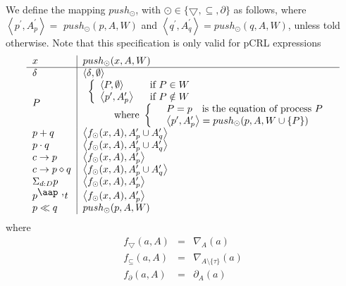 \documentclass{article}
\begin{document}
We define the mapping $push_{\odot }$, with $\odot \in \{\bigtriangledown
,\subseteq ,\partial \}$ as follows, where $\left\langle p^{\prime
},A_{p}^{\prime }\right\rangle =$ $push_{\odot }(p,A,W)$ and $\left\langle
q^{\prime },A_{q}^{\prime }\right\rangle =push_{\odot }(q,A,W)$, unless told
otherwise. Note that this specification is only valid for pCRL expressions%
\[
\begin{tabular}{l|l}
$x$ & $push_{\odot }(x,A,W)$ \\ \hline
$\delta $ & $\left\langle \delta ,\emptyset \right\rangle $ \\ 
$P$ & $%
\begin{array}{l}
\left\{ 
\begin{array}{ll}
\left\langle P,\emptyset \right\rangle & \text{if }P\in W \\ 
\left\langle p^{\prime },A_{p}^{\prime }\right\rangle & \text{if }P\notin W%
\end{array}%
\right. \\ 
\qquad \text{where }\left\{ \text{ }%
\begin{array}{l}
P=p\text{ is the equation of process }P \\ 
\left\langle p^{\prime },A_{p}^{\prime }\right\rangle =push_{\odot
}(p,A,W\cup \{P\})%
\end{array}%
\right.%
\end{array}%
$ \\ 
$p+q$ & $\left\langle f_{\odot }(x,A),A_{p}^{\prime }\cup A_{q}^{\prime
}\right\rangle $ \\ 
$p\cdot q$ & $\left\langle f_{\odot }(x,A),A_{p}^{\prime }\cup A_{q}^{\prime
}\right\rangle $ \\ 
$c\rightarrow p$ & $\left\langle f_{\odot }(x,A),A_{p}^{\prime
}\right\rangle $ \\ 
$c\rightarrow p\diamond q$ & $\left\langle f_{\odot }(x,A),A_{p}^{\prime
}\cup A_{q}^{\prime }\right\rangle $ \\ 
$\Sigma _{d:D}p$ & $\left\langle f_{\odot }(x,A),A_{p}^{\prime
}\right\rangle $ \\ 
$p^{\mathbin{\mbox{\aap ,}}}t$ & $\left\langle f_{\odot }(x,A),A_{p}^{\prime
}\right\rangle $ \\ 
$p\ll q$ & $push_{\odot }(p,A,W)$%
\end{tabular}%
\]%
where%
\begin{eqnarray*}
f_{\bigtriangledown }(a,A) &=&\nabla _{A}(a) \\
f_{\subseteq }(a,A) &=&\nabla _{A\setminus \{\tau \}}(a) \\
f_{\partial }(a,A) &=&\partial _{A}(a)
\end{eqnarray*}%
\end{document}
